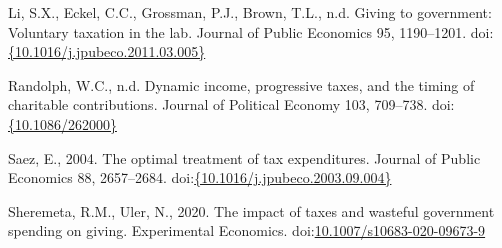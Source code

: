 \documentclass[ review  , 3p ]{elsarticle}
\begin{document}
  \leavevmode\hypertarget{ref-Li2011}{}%
  Li, S.X., Eckel, C.C., Grossman, P.J., Brown, T.L., n.d. Giving to government: Voluntary taxation in the lab. Journal of Public Economics 95, 1190--1201. doi:\href{https://doi.org/\%7B10.1016/j.jpubeco.2011.03.005\%7D}{\{10.1016/j.jpubeco.2011.03.005\}}
  
  \leavevmode\hypertarget{ref-Randolph1995}{}%
  Randolph, W.C., n.d. Dynamic income, progressive taxes, and the timing of charitable contributions. Journal of Political Economy 103, 709--738. doi:\href{https://doi.org/\%7B10.1086/262000\%7D}{\{10.1086/262000\}}
  
  \leavevmode\hypertarget{ref-Saez2004}{}%
  Saez, E., 2004. The optimal treatment of tax expenditures. Journal of Public Economics 88, 2657--2684. doi:\href{https://doi.org/\%7B10.1016/j.jpubeco.2003.09.004\%7D}{\{10.1016/j.jpubeco.2003.09.004\}}
  
  \leavevmode\hypertarget{ref-Sheremeta2020}{}%
  Sheremeta, R.M., Uler, N., 2020. The impact of taxes and wasteful government spending on giving. Experimental Economics. doi:\href{https://doi.org/10.1007/s10683-020-09673-9}{10.1007/s10683-020-09673-9}
\end{document}
